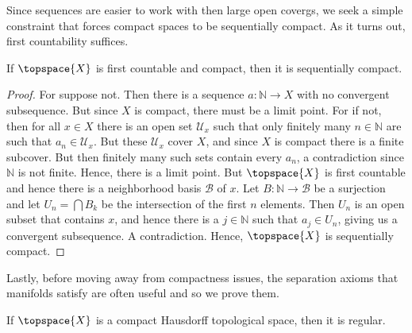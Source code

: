 \documentclass{article}                                                        %
\begin{document}
            Since sequences are easier to work with then large open covergs, we
            seek a simple constraint that forces compact spaces to be
            sequentially compact. As it turns out, first countability suffices.
            \begin{theorem}
                \label{thm:First_Countable_Compact_is_Seq_Compact}%
                If $\topspace{X}$ is first countable and compact, then it is
                sequentially compact.
            \end{theorem}
            \begin{proof}
                For suppose not. Then there is a sequence
                $a:\mathbb{N}\rightarrow{X}$ with no convergent subsequence.
                But since $X$ is compact, there must be a limit point. For if
                not, then for all $x\in{X}$ there is an open set
                $\mathcal{U}_{x}$ such that only finitely many $n\in\mathbb{N}$
                are such that $a_{n}\in\mathcal{U}_{x}$. But these
                $\mathcal{U}_{x}$ cover $X$, and since $X$ is compact there is
                a finite subcover. But then finitely many such sets contain
                every $a_{n}$, a contradiction since $\mathbb{N}$ is not finite.
                Hence, there is a limit point. But $\topspace{X}$ is first
                countable and hence there is a neighborhood basis
                $\mathcal{B}$ of $x$. Let $B:\mathbb{N}\rightarrow\mathcal{B}$
                be a surjection and let $U_{n}=\bigcap{B}_{k}$ be the
                intersection of the first $n$ elements. Then $U_{n}$ is an open
                subset that contains $x$, and hence there is a $j\in\mathbb{N}$
                such that $a_{j}\in{U}_{n}$, giving us a convergent subsequence.
                A contradiction. Hence, $\topspace{X}$ is sequentially compact.
            \end{proof}
            Lastly, before moving away from compactness issues, the separation
            axioms that manifolds satisfy are often useful and so we prove them.
            \begin{theorem}
                \label{thm:Compact_Hausdorff_is_Regular}%
                If $\topspace{X}$ is a compact Hausdorff topological space, then
                it is regular.
            \end{theorem}
\end{document}
